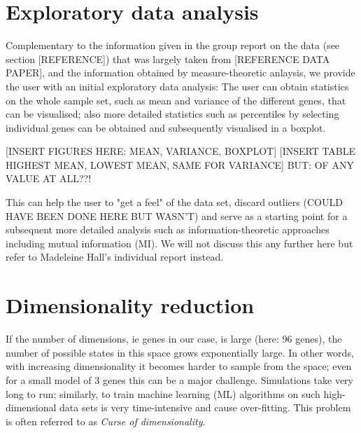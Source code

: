\documentclass[journal, a4paper]{IEEEtran}
\begin{document}
\section{Exploratory data analysis}

Complementary to the information given in the group report on the data (see section [REFERENCE]) that was largely taken from [REFERENCE DATA PAPER], and the information obtained by measure-theoretic anlaysis, we provide the user with an initial exploratory data analysis:
The user can obtain statistics on the whole sample set, such as mean and variance of the different genes, that can be visualised; also more detailed statistics such as percentiles by selecting individual genes can be obtained and subsequently visualised in a boxplot.

[INSERT FIGURES HERE: MEAN, VARIANCE, BOXPLOT] 
[INSERT TABLE HIGHEST MEAN, LOWEST MEAN, SAME FOR VARIANCE]
BUT: OF ANY VALUE AT ALL??!

This can help the user to "get a feel" of the data set, discard outliers (COULD HAVE BEEN DONE HERE BUT WASN'T) and serve as a starting point for a subsequent more detailed analysis such as information-theoretic approaches including mutual information (MI). We will not discuss this any further here but refer to Madeleine Hall's individual report instead.

\section{Dimensionality reduction}




If the number of dimensions, ie genes in our case, is large (here: 96 genes), the number of possible states in this space grows exponentially large. In other words, with increasing dimensionality it becomes harder to sample from the space; even for a small model of 3 genes this can be a major challenge. Simulations take very long to run; similarly, to train machine learning (ML) algorithms on such high-dimensional data sets is very time-intensive and cause over-fitting. %
This problem is often referred to as \textit{Curse of dimensionality}.
\end{document}
